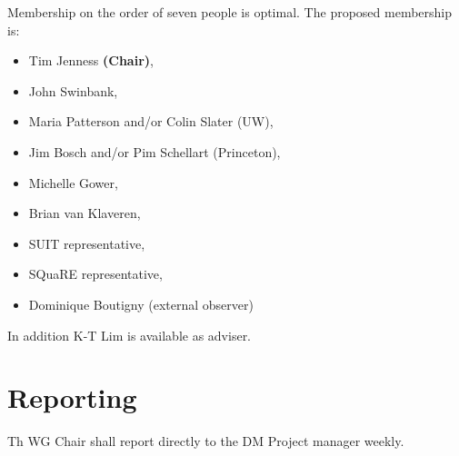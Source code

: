 Membership on the order of seven people is optimal.
The proposed membership is:

\begin{itemize}
  \item Tim Jenness \textbf{(Chair)},
  \item John Swinbank,
  \item Maria Patterson and/or Colin Slater (UW),
  \item Jim Bosch and/or Pim Schellart (Princeton),
  \item Michelle Gower,
  \item Brian van Klaveren,
  \item SUIT representative,
  \item SQuaRE representative,
  \item Dominique Boutigny (external observer)
\end{itemize}

In addition K-T Lim is available as adviser.

\section{Reporting}

Th WG Chair shall report directly to the DM Project manager weekly.
